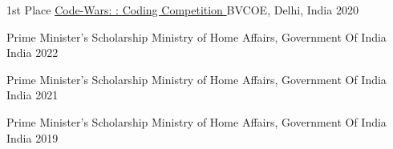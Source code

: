 \begin{cvhonors}
  \cvhonor
    {1st Place} %
    {\href{https://nikhil-bhasin.netlify.app/data/Bvcoe_Codewars.pdf}{Code-Wars: : Coding Competition }
    } %
    {BVCOE, Delhi, India} %
    {2020} %

  \cvhonor
    {Prime Minister's Scholarship} %
    {Ministry of Home Affairs, Government Of India} %
    {India} %
    {2022} %

  \cvhonor
    {Prime Minister's Scholarship} %
    {Ministry of Home Affairs, Government Of India} %
    {India} %
    {2021} %
    

  \cvhonor
    {Prime Minister's Scholarship} %
    {Ministry of Home Affairs, Government Of India} %
    {India} %
    {2019} %
    
\end{cvhonors}
